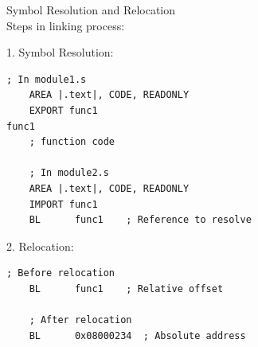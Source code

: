 \begin{KR}{Symbol Resolution and Relocation}\\
Steps in linking process:

1. Symbol Resolution:
\begin{lstlisting}[language=armasm, style=base]
    ; In module1.s
    AREA |.text|, CODE, READONLY
    EXPORT func1
func1
    ; function code
    
    ; In module2.s
    AREA |.text|, CODE, READONLY
    IMPORT func1
    BL      func1    ; Reference to resolve
\end{lstlisting}

2. Relocation:
\begin{lstlisting}[language=armasm, style=base]
    ; Before relocation
    BL      func1    ; Relative offset
    
    ; After relocation
    BL      0x08000234  ; Absolute address
\end{lstlisting}
\end{KR}

